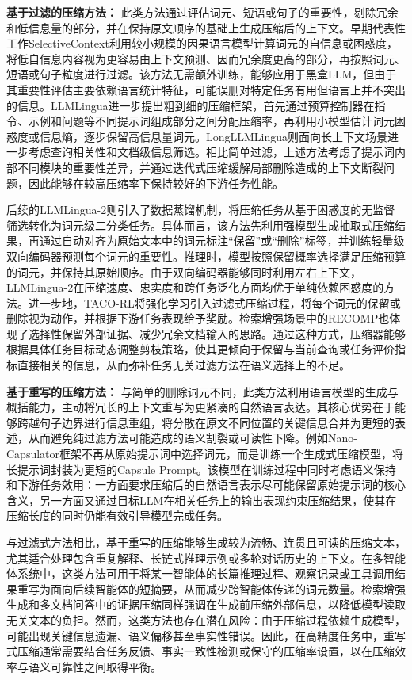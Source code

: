 \par\indent \textbf{基于过滤的压缩方法：}
此类方法通过评估词元、短语或句子的重要性，剔除冗余和低信息量的部分，并在保持原文顺序的基础上生成压缩后的上下文。早期代表性工作SelectiveContext\cite{ref55}利用较小规模的因果语言模型计算词元的自信息或困惑度，将低自信息内容视为更容易由上下文预测、因而冗余度更高的部分，再按照词元、短语或句子粒度进行过滤。该方法无需额外训练，能够应用于黑盒LLM，但由于其重要性评估主要依赖语言统计特征，可能误删对特定任务有用但语言上并不突出的信息。LLMLingua\cite{ref56}进一步提出粗到细的压缩框架，首先通过预算控制器在指令、示例和问题等不同提示词组成部分之间分配压缩率，再利用小模型估计词元困惑度或信息熵，逐步保留高信息量词元。LongLLMLingua则面向长上下文场景进一步考虑查询相关性和文档级信息筛选\cite{ref85}。相比简单过滤，上述方法考虑了提示词内部不同模块的重要性差异，并通过迭代式压缩缓解局部删除造成的上下文断裂问题，因此能够在较高压缩率下保持较好的下游任务性能。

后续的LLMLingua-2\cite{ref57}则引入了数据蒸馏机制，将压缩任务从基于困惑度的无监督筛选转化为词元级二分类任务。具体而言，该方法先利用强模型生成抽取式压缩结果，再通过自动对齐为原始文本中的词元标注“保留”或“删除”标签，并训练轻量级双向编码器预测每个词元的重要性。推理时，模型按照保留概率选择满足压缩预算的词元，并保持其原始顺序。由于双向编码器能够同时利用左右上下文，LLMLingua-2在压缩速度、忠实度和跨任务泛化方面均优于单纯依赖困惑度的方法。进一步地，TACO-RL\cite{ref58}将强化学习引入过滤式压缩过程，将每个词元的保留或删除视为动作，并根据下游任务表现给予奖励。检索增强场景中的RECOMP也体现了选择性保留外部证据、减少冗余文档输入的思路\cite{ref88}。通过这种方式，压缩器能够根据具体任务目标动态调整剪枝策略，使其更倾向于保留与当前查询或任务评价指标直接相关的信息，从而弥补任务无关过滤方法在语义选择上的不足。

\par\indent \textbf{基于重写的压缩方法：}
与简单的删除词元不同，此类方法利用语言模型的生成与概括能力，主动将冗长的上下文重写为更紧凑的自然语言表达。其核心优势在于能够跨越句子边界进行信息重组，将分散在原文不同位置的关键信息合并为更短的表述，从而避免纯过滤方法可能造成的语义割裂或可读性下降。例如Nano-Capsulator框架\cite{ref59}不再从原始提示词中选择词元，而是训练一个生成式压缩模型，将长提示词封装为更短的Capsule Prompt。该模型在训练过程中同时考虑语义保持和下游任务效用：一方面要求压缩后的自然语言表示尽可能保留原始提示词的核心含义，另一方面又通过目标LLM在相关任务上的输出表现约束压缩结果，使其在压缩长度的同时仍能有效引导模型完成任务。

与过滤式方法相比，基于重写的压缩能够生成较为流畅、连贯且可读的压缩文本，尤其适合处理包含重复解释、长链式推理示例或多轮对话历史的上下文。在多智能体系统中，这类方法可用于将某一智能体的长篇推理过程、观察记录或工具调用结果重写为面向后续智能体的短摘要，从而减少跨智能体传递的词元数量。检索增强生成和多文档问答中的证据压缩同样强调在生成前压缩外部信息，以降低模型读取无关文本的负担\cite{ref91,ref92}。然而，这类方法也存在潜在风险：由于压缩过程依赖生成模型，可能出现关键信息遗漏、语义偏移甚至事实性错误。因此，在高精度任务中，重写式压缩通常需要结合任务反馈、事实一致性检测或保守的压缩率设置，以在压缩效率与语义可靠性之间取得平衡。

